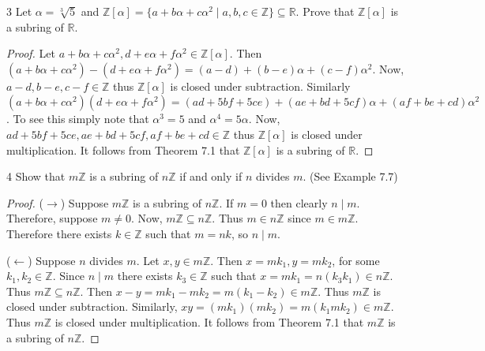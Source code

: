 \begin{problem}{3}
    Let $\alpha = \sqrt[3]{5}$ 
        and $\mathbb{Z}[\alpha] = \{a + b\alpha + c \alpha^2 \mid a, b, c \in \mathbb{Z}\} \subseteq \mathbb{R}$.
    Prove that $\mathbb{Z}[\alpha]$ is a subring of $\mathbb{R}$.
\end{problem}
\solved

\begin{proof}
    Let $a + b\alpha + c\alpha^2, d + e\alpha + f\alpha^2 \in \mathbb{Z}[\alpha]$.
    Then $(a + b\alpha + c\alpha^2) - (d + e\alpha + f\alpha^2) = (a - d) + (b - e)\alpha + (c - f)\alpha^2$.
    Now, $a - d, b - e, c - f \in \mathbb{Z}$ thus $\mathbb{Z}[\alpha]$ is closed under subtraction.
    Similarly $
    (a + b\alpha + c\alpha^2)(d + e\alpha + f\alpha^2)
    = (ad + 5bf + 5ce) + (ae + bd + 5cf)\alpha + (af + be + cd)\alpha^2$.
    To see this simply note that $\alpha^3 = 5$ and $\alpha^4 = 5\alpha$.
    Now, $ad + 5bf + 5ce, ae + bd + 5cf, af + be + cd \in \mathbb{Z}$ thus $\mathbb{Z}[\alpha]$ is closed under multiplication.
    It follows from Theorem 7.1 that $\mathbb{Z}[\alpha]$ is a subring of $\mathbb{R}$.
\end{proof}

\begin{problem}{4}
    Show that $m\mathbb{Z}$ is a subring of $n\mathbb{Z}$ if and only if 
        $n$ divides $m$. (See Example 7.7)
\end{problem}
\solved

\begin{proof}
    ($\longrightarrow$) Suppose $m\mathbb{Z}$ is a subring of $n\mathbb{Z}$.
    If $m = 0$ then clearly $n \mid m$.
    Therefore, suppose $m \ne 0$.
    Now, $m\mathbb{Z} \subseteq n\mathbb{Z}$.
    Thus $m \in n\mathbb{Z}$ since $m \in m\mathbb{Z}$.
    Therefore there exists $k \in \mathbb{Z}$ such that $m = nk$,
    so $n \mid m$.

    ($\longleftarrow$) Suppose $n$ divides $m$.
    Let $x, y \in m\mathbb{Z}$.
    Then $x = m k_1, y = m k_2$, for some $k_1, k_2 \in \mathbb{Z}$.
    Since $n \mid m$ there exists $k_3 \in \mathbb{Z}$ such that $x = m k_1 = n(k_3 k_1) \in n \mathbb{Z}$.
    Thus $m \mathbb{Z} \subseteq n \mathbb{Z}$.
    Then $x - y = m k_1 - m k_2 = m(k_1 - k_2) \in m\mathbb{Z}$.
    Thus $m\mathbb{Z}$ is closed under subtraction.
    Similarly, $x y = (m k_1)(m k_2) = m(k_1 m k_2) \in m\mathbb{Z}$.
    Thus $m\mathbb{Z}$ is closed under multiplication.
    It follows from Theorem 7.1 that $m\mathbb{Z}$ is a subring of $n\mathbb{Z}$.
\end{proof}

